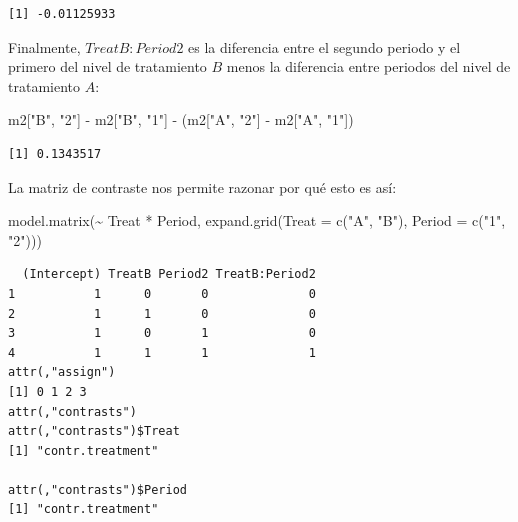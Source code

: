 \documentclass[
  12pt,
  a4paper,
  extrafontsizes,
  onecolumn,
  openright,
  table]{memoir}
\newenvironment{Shaded}{\begin{snugshade}}{\end{snugshade}}
\newcommand{\AttributeTok}[1]{\textcolor[rgb]{0.40,0.45,0.13}{#1}}
\newcommand{\FunctionTok}[1]{\textcolor[rgb]{0.28,0.35,0.67}{#1}}
\newcommand{\NormalTok}[1]{\textcolor[rgb]{0.00,0.23,0.31}{#1}}
\newcommand{\SpecialCharTok}[1]{\textcolor[rgb]{0.37,0.37,0.37}{#1}}
\newcommand{\StringTok}[1]{\textcolor[rgb]{0.13,0.47,0.30}{#1}}
\begin{document}
\begin{verbatim}
[1] -0.01125933
\end{verbatim}

\normalsize

Finalmente, \(TreatB:Period2\) es la diferencia entre el segundo periodo
y el primero del nivel de tratamiento \(B\) menos la diferencia entre
periodos del nivel de tratamiento \(A\):

\scriptsize

\begin{Shaded}
\begin{Highlighting}[]
\NormalTok{m2[}\StringTok{"B"}\NormalTok{, }\StringTok{"2"}\NormalTok{] }\SpecialCharTok{{-}}\NormalTok{ m2[}\StringTok{"B"}\NormalTok{, }\StringTok{"1"}\NormalTok{] }\SpecialCharTok{{-}}\NormalTok{ (m2[}\StringTok{"A"}\NormalTok{, }\StringTok{"2"}\NormalTok{] }\SpecialCharTok{{-}}\NormalTok{ m2[}\StringTok{"A"}\NormalTok{, }\StringTok{"1"}\NormalTok{])}
\end{Highlighting}
\end{Shaded}

\begin{verbatim}
[1] 0.1343517
\end{verbatim}

\normalsize

La matriz de contraste nos permite razonar por qué esto es así:

\scriptsize

\begin{Shaded}
\begin{Highlighting}[]
\FunctionTok{model.matrix}\NormalTok{(}\SpecialCharTok{\textasciitilde{}}\NormalTok{ Treat }\SpecialCharTok{*}\NormalTok{ Period, }\FunctionTok{expand.grid}\NormalTok{(}\AttributeTok{Treat =} \FunctionTok{c}\NormalTok{(}\StringTok{"A"}\NormalTok{, }\StringTok{"B"}\NormalTok{), }\AttributeTok{Period =} \FunctionTok{c}\NormalTok{(}\StringTok{"1"}\NormalTok{, }\StringTok{"2"}\NormalTok{)))}
\end{Highlighting}
\end{Shaded}

\begin{verbatim}
  (Intercept) TreatB Period2 TreatB:Period2
1           1      0       0              0
2           1      1       0              0
3           1      0       1              0
4           1      1       1              1
attr(,"assign")
[1] 0 1 2 3
attr(,"contrasts")
attr(,"contrasts")$Treat
[1] "contr.treatment"

attr(,"contrasts")$Period
[1] "contr.treatment"
\end{verbatim}
\end{document}

